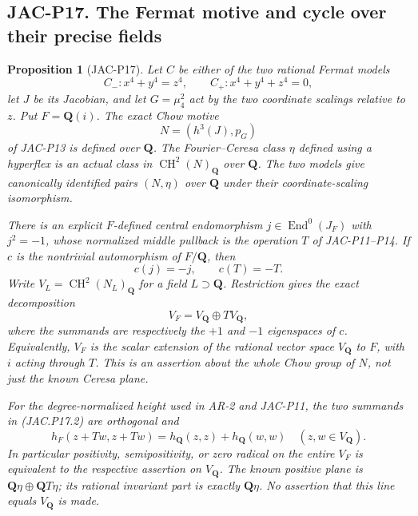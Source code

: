\documentclass[11pt,a4paper]{article}
\newtheorem{proposition}[theorem]{Proposition}
\begin{document}
\subsection*{JAC-P17. The Fermat motive and cycle over their precise fields}

\begin{proposition}[JAC-P17]\label{jac:P17}
Let $C$ be either of the two rational Fermat models
\[
 C_-:x^4+y^4=z^4,\qquad C_+:x^4+y^4+z^4=0,
\]
let $J$ be its Jacobian, and let $G=\mu_4^2$ act by the two
coordinate scalings relative to $z$. Put $F=\mathbf Q(i)$.
The exact Chow motive
\[
                    N=(h^3(J),p_G)
\]
of JAC-P13 is defined over $\mathbf Q$. The Fourier--Ceresa
class $\eta$ defined using a hyperflex is an actual class in
$\operatorname{CH}^2(N)_{\mathbf Q}$ over $\mathbf Q$.
The two models give canonically identified pairs $(N,\eta)$
over $\mathbf Q$ under their coordinate-scaling isomorphism.

There is an explicit $F$-defined central endomorphism
$j\in\operatorname{End}^0(J_F)$ with $j^2=-1$, whose normalized
middle pullback is the operation $T$ of JAC-P11--P14.
If $c$ is the nontrivial automorphism of $F/\mathbf Q$, then
\[
                  c(j)=-j,\qquad c(T)=-T.              \tag{JAC.P17.1}
\]
Write $V_L=\operatorname{CH}^2(N_L)_{\mathbf Q}$ for a field
$L\supset\mathbf Q$. Restriction gives the exact decomposition
\[
                  V_F=V_{\mathbf Q}\oplus T V_{\mathbf Q},
                                                               \tag{JAC.P17.2}
\]
where the summands are respectively the $+1$ and $-1$
eigenspaces of $c$. Equivalently, $V_F$ is the scalar extension
of the rational vector space $V_{\mathbf Q}$ to $F$, with
$i$ acting through $T$. This is an assertion about the whole
Chow group of $N$, not just the known Ceresa plane.

For the degree-normalized height used in AR-2 and JAC-P11,
the two summands in (JAC.P17.2) are orthogonal and
\[
 h_F(z+Tw,z+Tw)=h_{\mathbf Q}(z,z)+h_{\mathbf Q}(w,w)
       \quad(z,w\in V_{\mathbf Q}).                   \tag{JAC.P17.3}
\]
In particular positivity, semipositivity, or zero radical on
the entire $V_F$ is equivalent to the respective assertion on
$V_{\mathbf Q}$. The known positive plane is
$\mathbf Q\eta\oplus\mathbf Q T\eta$; its rational invariant
part is exactly $\mathbf Q\eta$.
No assertion that this line equals $V_{\mathbf Q}$ is made.
\end{proposition}
\end{document}
